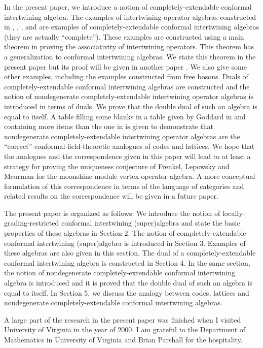 \documentclass{amsproc}
\theoremstyle{definition}
\theoremstyle{remark}
\numberwithin{equation}{section}
\begin{document}
In the present paper, we introduce a notion of completely-extendable
conformal intertwining algebra.  The examples of intertwining operator
algebras constructed in \cite{H2}, \cite{H3}, \cite{HL5}, \cite{HM1}
and \cite{HM2} are examples of completely-extendable conformal
intertwining algebras (they are actually ``complete'').  These
examples are constructed using a main theorem in \cite{H1} proving the
associativity of intertwining operators. This theorem has a
generalization to conformal intertwining algebras. We state this
theorem in the present paper but its proof will be given in another
paper \cite{H7}.  We also give some other examples, including the
examples constructed from free bosons.  Duals of completely-extendable
conformal intertwining algebras are constructed and the notion of
nondegenerate completely-extendable intertwining operator algebras is
introduced in terms of duals. We prove that the double dual of such an
algebra is equal to itself.  A table filling some blanks in a table
given by Goddard in \cite{G} and containing more items than the one in
\cite{G} is given to demonstrate that nondegenerate
completely-extendable intertwining operator algebras are the ``correct''
conformal-field-theoretic analogues of codes and lattices.  We hope
that the analogues and the correspondence given in this paper will lead to
at least a strategy for proving the uniqueness conjecture of
Frenkel, Lepowsky and Meurman for the moonshine module vertex operator
algebra. A more conceptual formulation of this correspondence in terms
of the language of categories and related results on the correspondence
will be given in a future paper.

The present paper is organized as follows: We introduce the notion 
of locally-grading-restricted 
conformal intertwining (super)algebra and state the basic properties of 
these algebras in Section 2. The notion of completely-extendable
conformal intertwining (super)algebra is introduced in Section 3. 
Examples of these algebras
are also given in this section. The dual of 
a completely-extendable conformal
intertwining  algebra is constructed in Section 4. 
In the same section, the notion of nondegenerate 
completely-extendable
conformal intertwining algebra is 
introduced and it is proved that the double
dual of such an algebra is equal to itself. 
In Section 5, we discuss the analogy between codes, lattices and 
nondegenerate 
completely-extendable conformal
intertwining algebras. 

\vspace{1em}
 A large part of 
the research in the present paper
was finished when I visited University of Virginia in the 
year of 2000. I am grateful to the Department of Mathematics 
in University of Virginia and  Brian Parshall for the hospitality. 
\end{document}
